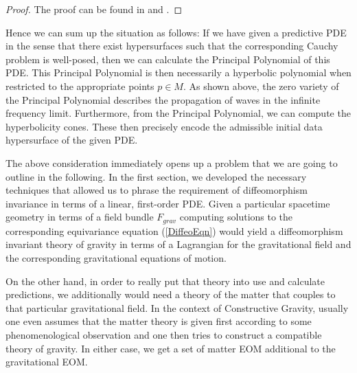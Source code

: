 \documentclass[a4paper,12pt, DIV=14, BCOR=5mm, twoside, headsepline, numbers=noenddot]{scrbook}
\begin{document}
\begin{proof}
The proof can be found in \cite{Hormander1977} and \cite{Ivrii_1974}.
\end{proof}
Hence we can sum up the situation as follows: If we have given a predictive PDE in the sense that there exist hypersurfaces such that the corresponding Cauchy problem is well-posed, then we can calculate the Principal Polynomial of this PDE. This Principal Polynomial is then necessarily a hyperbolic polynomial when restricted to the appropriate points $p \in M$. As shown above, the zero variety of the Principal Polynomial describes the propagation of waves in the infinite frequency limit. Furthermore, from the Principal Polynomial, we can compute the hyperbolicity cones. These then precisely encode the admissible initial data hypersurface of the given PDE.

The above consideration immediately opens up a problem that we are going to outline in the following. In the first section, we developed the necessary techniques that allowed us to phrase the requirement of diffeomorphism invariance in terms of a linear, first-order PDE. Given a particular spacetime geometry in terms of a field bundle $F_{grav}$ computing solutions to the corresponding equivariance equation (\ref{DiffeoEqn}) would yield a diffeomorphism invariant theory of gravity in terms of a Lagrangian for the gravitational field and the corresponding gravitational equations of motion.  

On the other hand, in order to really put that theory into use and calculate predictions, we additionally would need a theory of the matter that couples to that particular gravitational field. In the context of Constructive Gravity, usually one even assumes that the matter theory is given first according to some phenomenological observation and one then tries to construct a compatible theory of gravity. In either case, we get a set of matter EOM additional to the gravitational EOM.
\end{document}
